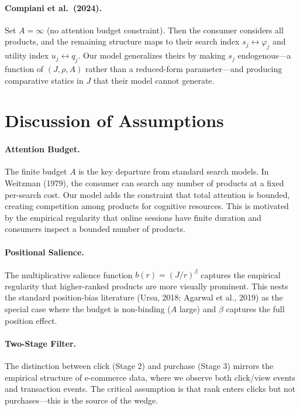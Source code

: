 \documentclass[12pt]{article}
\begin{document}
\paragraph{Compiani et al.\ (2024).}
Set $A = \infty$ (no attention budget constraint). Then the consumer considers all products, and the remaining structure maps to their search index $s_j \leftrightarrow \varphi_j$ and utility index $u_j \leftrightarrow q_j$. Our model generalizes theirs by making $s_j$ endogenous---a function of $(J, \rho, A)$ rather than a reduced-form parameter---and producing comparative statics in $J$ that their model cannot generate.

\section{Discussion of Assumptions}\label{sec:assumptions_discussion}

\paragraph{Attention Budget.} The finite budget $A$ is the key departure from standard search models. In Weitzman (1979), the consumer can search any number of products at a fixed per-search cost. Our model adds the constraint that total attention is bounded, creating competition among products for cognitive resources. This is motivated by the empirical regularity that online sessions have finite duration and consumers inspect a bounded number of products.

\paragraph{Positional Salience.} The multiplicative salience function $b(r) = (J/r)^\beta$ captures the empirical regularity that higher-ranked products are more visually prominent. This nests the standard position-bias literature (Ursu, 2018; Agarwal et al., 2019) as the special case where the budget is non-binding ($A$ large) and $\beta$ captures the full position effect.

\paragraph{Two-Stage Filter.} The distinction between click (Stage 2) and purchase (Stage 3) mirrors the empirical structure of e-commerce data, where we observe both click/view events and transaction events. The critical assumption is that rank enters clicks but not purchases---this is the source of the wedge.
\end{document}
